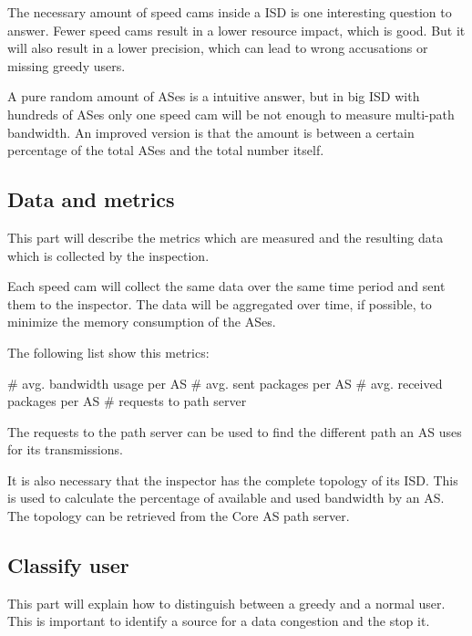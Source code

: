\documentclass[thesis.tex]{subfiles}
\begin{document}

The necessary amount of speed cams inside a ISD is one interesting question to answer. Fewer speed cams result in a lower resource impact, which is good. But it will also result in a lower precision, which can lead to wrong accusations or missing greedy users.

A pure random amount of ASes is a intuitive answer, but in big ISD with hundreds of ASes only one speed cam will be not enough to measure multi-path bandwidth. An improved version is that the amount is between a certain percentage of the total ASes and the total number itself.


\subsection{Data and metrics}
This part will describe the metrics which are measured and the resulting data which is collected by the inspection.

Each speed cam will collect the same data over the same time period and sent them to the inspector. The data will be aggregated over time, if possible, to minimize the memory consumption of the ASes.

The following list show this metrics:
\begin{easylist}
    \MyListProperties
    # avg. bandwidth usage per AS
    # avg. sent packages per AS
    # avg. received packages per AS
    # requests to path server 
\end{easylist}

The requests to the path server can be used to find the different path an AS uses for its transmissions. 

It is also necessary that the inspector has the complete topology of its ISD. This is used to calculate the percentage of available and used bandwidth by an AS. The topology can be retrieved from the Core AS path server.


\subsection{Classify user}
This part will explain how to distinguish between a greedy and a normal user. This is important to identify a source for a data congestion and the stop it.
\end{document}

